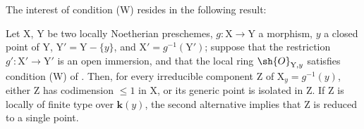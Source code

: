 The interest of condition (W) resides in the following result:
\begin{proposition}[21.12.10]
\label{IV.21.12.10}
Let $\mathrm{X}$, $\mathrm{Y}$ be two locally Noetherian preschemes, $g:\mathrm{X}\to\mathrm{Y}$ a morphism, $y$ a closed point of $\mathrm{Y}$, $\mathrm{Y}'=\mathrm{Y}-\{y\}$, and $\mathrm{X}'=g^{-1}(\mathrm{Y}')$; suppose that the restriction $g':\mathrm{X}'\to\mathrm{Y}'$ is an open immersion, and that the local ring $\sh{O}_{\mathrm{Y},y}$ satisfies condition \textup{(W)} of .
Then, for every irreducible component $\mathrm{Z}$ of $\mathrm{X}_y=g^{-1}(y)$, either $\mathrm{Z}$ has codimension $\leq 1$ in $\mathrm{X}$, or its generic point is isolated in $\mathrm{Z}$.
If $\mathrm{Z}$ is locally of finite type over $\boldsymbol{k}(y)$, the second alternative implies that $\mathrm{Z}$ is reduced to a single point.
\end{proposition}

